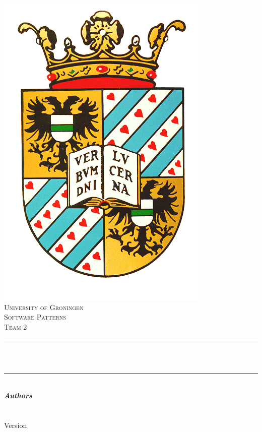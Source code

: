 

\begin{titlepage}
	\centering
    
    \vspace*{0.5 cm}
    \includegraphics[scale = 0.25]{images/rug.png}\\[1.0 cm]	%
    \textsc{\LARGE University of Groningen}\\[0.3cm]
	\textsc{\large {Software Patterns}}\\
	\textsc{\large {Team 2}} \\[2.0 cm]
	\rule{\linewidth}{0.2 mm} \\[0.4 cm]
	{ \huge \bfseries \thetitle}\\
	
	\rule{\linewidth}{0.2 mm} \\[1.5 cm]
			\textbf{\large\emph\textbf{Authors}}\\
			\theauthor
	\\[2 cm]	
	{\large \thedate}\\[0.25cm]
		Version \VersionNumber \\
		\renewcommand{\headrulewidth}{0pt}
	\vfill
\end{titlepage}